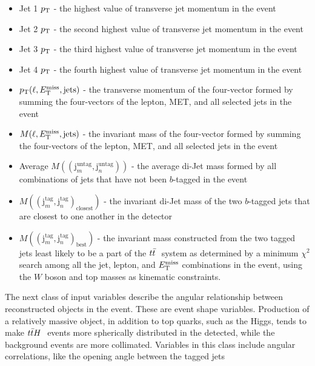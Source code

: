\begin{itemize}
  \item Jet 1 $p_{\mathrm{T}}$ - the highest value of transverse jet momentum in
    the event
  \item Jet 2 $p_{\mathrm{T}}$ - the second highest value of transverse jet
    momentum in the event
  \item Jet 3 $p_{\mathrm{T}}$  - the third highest value of transverse jet
    momentum in the event
  \item Jet 4 $p_{\mathrm{T}}$  - the fourth highest value of transverse jet
    momentum in the event
  \item $p_{\mathrm{T}}(\ell,E_{\mathrm{T}}^{\text{miss}},\text{jets})$ - the transverse momentum of the
    four-vector formed by summing the four-vectors of the lepton, MET,
    and all selected jets in the event
  \item $M(\ell,E_{\mathrm{T}}^{\text{miss}},\text{jets})$ - the invariant mass of the
    four-vector formed by summing the four-vectors of the lepton, MET,
    and all selected jets in the event
  \item Average
    $M((\text{j}_m^{\text{untag}},\text{j}_n^{\text{untag}}))$ - the
    average di-Jet mass formed by all combinations of jets that have
    not been $b$-tagged in the event
  \item
    $M((\text{j}_m^{\text{tag}},\text{j}_n^{\text{tag}})_{\text{closest}})$
    - the invariant di-Jet mass of the two $b$-tagged jets that are
    closest to one another in the detector
  \item
    $M((\text{j}_m^{\text{tag}},\text{j}_n^{\text{tag}})_{\text{best}})$
    - the invariant mass constructed from the two tagged jets least
    likely to be a part of the $t{\bar{t}}~$ system as determined by a
    minimum $\chi^2$ search among all the jet, lepton, and $E_{\mathrm{T}}^{\text{miss}}$
    combinations in the event, using the $W$ boson and top masses as
    kinematic constraints.
\end{itemize}

\par The next class of input variables describe the angular
relationship between reconstructed objects in the event.  These are
event shape variables.  Production of a relatively massive object, in
addition to top quarks, such as the Higgs, tends to make $t{\bar{t}}H~$
events more spherically distributed in the detected, while the
background events are more collimated.  Variables in this class
include angular correlations, like the opening angle between the
tagged jets 

